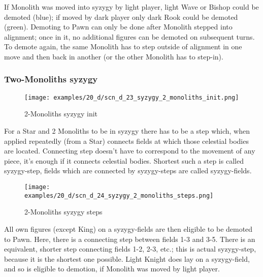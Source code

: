 If Monolith was moved into syzygy by light player, light Wave or Bishop could be
demoted (blue); if moved by dark player only dark Rook could be demoted (green).
Demoting to Pawn can only be done after Monolith stepped into alignment; once in
it, no additional figures can be demoted on subsequent turns. To demote again,
the same Monolith has to step outside of alignment in one move and then back in
another (or the other Monolith has to step-in).

\clearpage %

\subsubsection*{Two-Monoliths syzygy}
\label{sec:Discovery/Monolith/Syzygy/Two-Monoliths syzygy}

\vspace*{-1.4\baselineskip}
\noindent
\begin{figure}[!h]
\texttt{[image: examples/20\_d/scn\_d\_23\_syzygy\_2\_monoliths\_init.png]}
\caption{2-Monoliths syzygy init}
\label{fig:scn_d_23_syzygy_2_monoliths_init}
\end{figure}

For a Star and 2 Monoliths to be in syzygy there has to be a step which, when applied
repeatedly (from a Star) connects fields at which those celestial bodies are located.
Connecting step doesn't have to correspond to the movement of any piece, it's enough
if it connects celestial bodies. Shortest such a step is called syzygy-step, fields
which are connected by syzygy-steps are called syzygy-fields.

\clearpage %

\noindent
\begin{figure}[!h]
\texttt{[image: examples/20\_d/scn\_d\_24\_syzygy\_2\_monoliths\_steps.png]}
\caption{2-Monoliths syzygy steps}
\label{fig:scn_d_24_syzygy_2_monoliths_steps}
\end{figure}

All own figures (except King) on a syzygy-fields are then eligible to be demoted
to Pawn. Here, there is a connecting step between fields 1-3 and 3-5. There is an
equivalent, shorter step connecting fields 1-2, 2-3, etc.; this is actual syzygy-step,
because it is the shortest one possible. Light Knight does lay on a syzygy-field, and
so is eligible to demotion, if Monolith was moved by light player.

